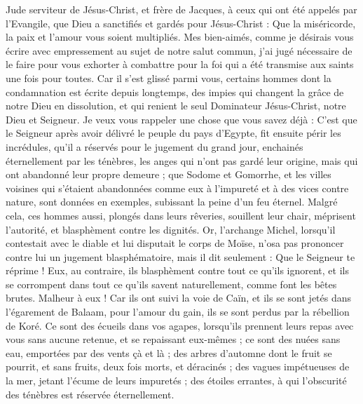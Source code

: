 \BFont
\begin{multicols}{2}
\TextTitle{[Introduction]}
\VerseOne{}Jude serviteur de Jésus-Christ, et frère de Jacques, à ceux qui ont été appelés par l'Evangile, que Dieu a sanctifiés et gardés pour Jésus-Christ :
Que la miséricorde, la paix et l'amour vous soient multipliés.
Mes bien-aimés, comme je désirais vous écrire avec empressement au sujet de notre salut commun, j’ai jugé nécessaire de le faire pour vous exhorter à combattre pour la foi qui a été transmise aux saints une fois pour toutes.
Car il s’est glissé parmi vous, certains hommes dont la condamnation est écrite depuis longtemps, des impies qui changent la grâce de notre Dieu en dissolution, et qui renient le seul Dominateur Jésus-Christ, notre Dieu et Seigneur.
Je veux vous rappeler une chose que vous savez déjà : C'est que le Seigneur après avoir délivré le peuple du pays d'Egypte, fit ensuite périr les incrédules,
qu’il a réservés pour le jugement du grand jour, enchainés éternellement par les ténèbres, les anges qui n'ont pas gardé leur origine, mais qui ont abandonné leur propre demeure ;
que Sodome et Gomorrhe, et les villes voisines qui s'étaient abandonnées comme eux à l'impureté et à des vices contre nature, sont données en exemples, subissant la peine d’un feu éternel.
Malgré cela, ces hommes aussi, plongés dans leurs rêveries, souillent leur chair, méprisent l’autorité, et blasphèment contre les dignités.
Or, l'archange Michel, lorsqu’il contestait avec le diable et lui disputait le corps de Moïse, n'osa pas prononcer contre lui un jugement blasphématoire, mais il dit seulement : Que le Seigneur te réprime !
Eux, au contraire, ils blasphèment contre tout ce qu'ils ignorent, et ils se corrompent dans tout ce qu'ils savent naturellement, comme font les bêtes brutes.
Malheur à eux ! Car ils ont suivi la voie de Caïn, et ils se sont jetés dans l’égarement de Balaam, pour l’amour du gain, ils se sont perdus par la rébellion de Koré{}.
Ce sont des écueils dans vos agapes, lorsqu’ils prennent leurs repas avec vous sans aucune retenue, et se repaissant eux-mêmes ; ce sont des nuées sans eau, emportées par des vents çà et là ; des arbres d’automne dont le fruit se pourrit, et sans fruits, deux fois morts, et déracinés ;
des vagues impétueuses de la mer, jetant l'écume de leurs impuretés ; des étoiles errantes, à qui l'obscurité des ténèbres est réservée éternellement.

\end{multicols}
